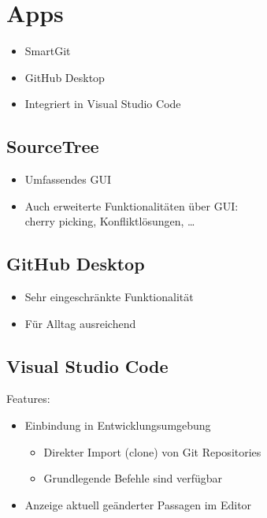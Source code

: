 \section{Apps}
\begin{frame}
\begin{itemize}
	\item SmartGit
	\item GitHub Desktop
	\item Integriert in Visual Studio Code
\end{itemize}
\end{frame}

\subsection{SourceTree}
\begin{frame}
\begin{itemize}
\item Umfassendes GUI
\item Auch erweiterte Funktionalitäten über GUI:\\
cherry picking, Konfliktlösungen, …
\end{itemize}
\end{frame}

\subsection{GitHub Desktop}
\begin{frame}
\begin{itemize}
\item Sehr eingeschränkte Funktionalität
\item Für Alltag ausreichend
\end{itemize}
\end{frame}

\subsection{Visual Studio Code}
\begin{frame}
Features:
\begin{itemize}
	\item <2->Einbindung in Entwicklungsumgebung
	\begin{itemize}
		\item <3->Direkter Import (clone) von Git Repositories
		\item <4->Grundlegende Befehle sind verfügbar
	\end{itemize}
	\item <5->Anzeige aktuell geänderter Passagen im Editor
\end{itemize}
\end{frame}